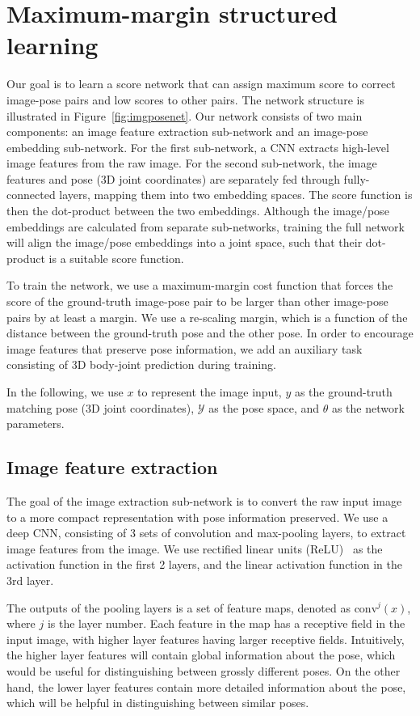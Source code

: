 \documentclass[10pt,twocolumn,letterpaper]{article}
\newcommand{\conv}{\mathrm{conv}}
\begin{document}
 
 \section{Maximum-margin structured learning}
\label{sec:structnet}
Our goal is to learn a score network that can assign maximum score to  correct image-pose pairs and low scores to other pairs.
The network structure is illustrated in Figure~\ref{fig:imgposenet}.
Our network consists of two main components: an image feature extraction sub-network and an image-pose embedding sub-network.
For the first sub-network, a CNN extracts high-level image features from the raw image.
For the second sub-network, 
the image features and pose (3D joint coordinates) are separately fed through fully-connected layers, mapping them into two embedding spaces. The score function is then the dot-product between the two embeddings.
Although the image/pose embeddings are calculated from separate sub-networks, training the full network will align the image/pose embeddings into a joint space, such that their dot-product is a suitable score function.


To train the network, we use a maximum-margin cost function that forces the score
of the ground-truth image-pose pair to be larger than other image-pose pairs by at least a margin.  We use a re-scaling margin, which is a function of the distance between the ground-truth pose and the other pose.
In order to encourage image features that preserve pose information, we add an auxiliary task consisting of 3D body-joint prediction during training.

In the following, we use $x$ to represent the image input, $y$ as the ground-truth matching pose (3D joint coordinates), $\mathcal{Y}$ as the pose space, and $\theta$ as the network parameters.

\subsection{Image feature extraction}
\vspace{-0.05in}
The goal of the image extraction sub-network is to convert the raw input image to a more compact representation with pose information preserved.
We use a deep CNN, consisting of 3 sets of convolution and max-pooling layers,  to extract image features from the image.
We use rectified linear units (ReLU)~\cite{relu2010} as the activation function in the first 2 layers, and the linear activation function in the 3rd  layer.

The outputs of the pooling layers is a set of feature maps, denoted as $\conv^j(x)$, where $j$ is the layer number. 
Each feature in the map has a receptive field in the input image, with higher layer features having larger receptive fields.
Intuitively, the higher layer features will contain global information about the pose, which would be useful for distinguishing between grossly different poses.
On the other hand, the lower layer features contain more detailed information about the pose, which will be helpful in distinguishing between similar poses.
\end{document}
